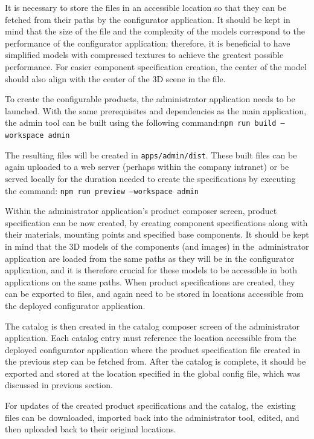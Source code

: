 It is necessary to store the files in an accessible location so that they can be fetched from their paths by the configurator application. It should be kept in mind that the size of the file and the complexity of the models correspond to the performance of the configurator application; therefore, it is beneficial to have simplified models with compressed textures to achieve the greatest possible performance. For easier component specification creation, the center of the model should also align with the center of the 3D scene in the file.

To create the configurable products, the administrator application needs to be launched. With the same prerequisites and dependencies as the main application, the admin tool can be built using the following command:\linebreak\texttt{npm run build --workspace admin}

The resulting files will be created in \texttt{apps/admin/dist}. These built files can be again uploaded to a web server (perhaps within the company intranet) or be served locally for the duration needed to create the specifications by executing the command: \texttt{npm run preview --workspace admin}

Within the administrator application's product composer screen, product specification can be now created, by creating component specifications along with their materials, mounting points and specified base components. It should be kept in mind that the 3D models of the components (and images) in the~administrator application are loaded from the same paths as they will be in the configurator application, and it is therefore crucial for these models to be accessible in both applications on the same paths. When product specifications are created, they can be exported to  files, and again need to be stored in locations accessible from the deployed configurator application.

The catalog is then created in the catalog composer screen of the administrator application. Each catalog entry must reference the location accessible from the deployed configurator application where the product specification file created in the previous step can be fetched from. After the catalog is complete, it should be exported and stored at the location specified in the global config file, which was discussed in previous section.

For updates of the created product specifications and the catalog, the~existing files can be downloaded, imported back into the administrator tool, edited, and then uploaded back to their original locations.


